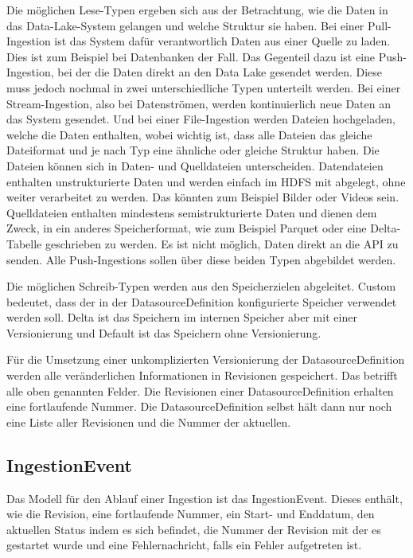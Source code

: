 Die möglichen Lese-Typen ergeben sich aus der Betrachtung, wie die Daten in das Data-Lake-System gelangen und welche Struktur sie haben.
Bei einer Pull-Ingestion ist das System dafür verantwortlich Daten aus einer Quelle zu laden.
Dies ist zum Beispiel bei Datenbanken der Fall.
Das Gegenteil dazu ist eine Push-Ingestion, bei der die Daten direkt an den Data Lake gesendet werden.
Diese muss jedoch nochmal in zwei unterschiedliche Typen unterteilt werden.
Bei einer Stream-Ingestion, also bei Datenströmen, werden kontinuierlich neue Daten an das System gesendet.
Und bei einer File-Ingestion werden Dateien hochgeladen, welche die Daten enthalten, wobei wichtig ist, dass alle Dateien das gleiche Dateiformat und je nach Typ eine ähnliche oder gleiche Struktur haben.
Die Dateien können sich in Daten- und Quelldateien unterscheiden.
Datendateien enthalten unstrukturierte Daten und werden einfach im HDFS mit abgelegt, ohne weiter verarbeitet zu werden.
Das könnten zum Beispiel Bilder oder Videos sein.
Quelldateien enthalten mindestens semistrukturierte Daten und dienen dem Zweck, in ein anderes Speicherformat, wie zum Beispiel Parquet oder eine Delta-Tabelle geschrieben zu werden.
Es ist nicht möglich, Daten direkt an die API zu senden.
Alle Push-Ingestions sollen über diese beiden Typen abgebildet werden.

Die möglichen Schreib-Typen werden aus den Speicherzielen abgeleitet.
Custom bedeutet, dass der in der DatasourceDefinition konfigurierte Speicher verwendet werden soll.
Delta ist das Speichern im internen Speicher aber mit einer Versionierung und Default ist das Speichern ohne Versionierung.

Für die Umsetzung einer unkomplizierten Versionierung der DatasourceDefinition werden alle veränderlichen Informationen in Revisionen gespeichert.
Das betrifft alle oben genannten Felder.
Die Revisionen einer DatasourceDefinition erhalten eine fortlaufende Nummer.
Die DatasourceDefinition selbst hält dann nur noch eine Liste aller Revisionen und die Nummer der aktuellen.

\subsection{IngestionEvent}

Das Modell für den Ablauf einer Ingestion ist das IngestionEvent.
Dieses enthält, wie die Revision, eine fortlaufende Nummer, ein Start- und Enddatum, den aktuellen Status indem es sich befindet, die Nummer der Revision mit der es gestartet wurde und eine Fehlernachricht, falls ein Fehler aufgetreten ist.


